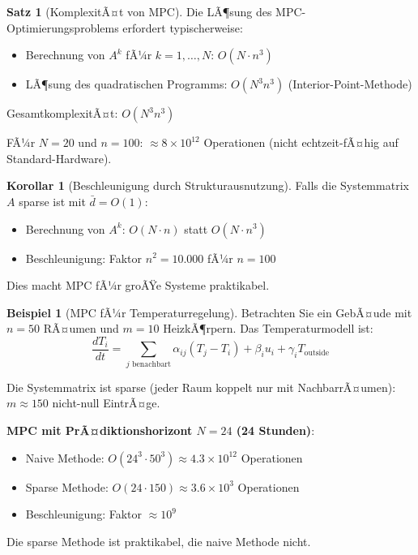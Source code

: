 ﻿\documentclass[a4paper,12pt]{report}
\theoremstyle{definition}
\newtheorem{beispiel}{Beispiel}
\newtheorem{satz}{Satz}
\newtheorem{korollar}{Korollar}
\begin{document}
	\begin{satz}[KomplexitÃ¤t von MPC]
		Die LÃ¶sung des MPC-Optimierungsproblems erfordert typischerweise:
		\begin{itemize}
			\item Berechnung von $A^k$ fÃ¼r $k = 1, \ldots, N$: $O(N \cdot n^3)$
			\item LÃ¶sung des quadratischen Programms: $O(N^3 n^3)$ (Interior-Point-Methode)
		\end{itemize}
		
		GesamtkomplexitÃ¤t: $O(N^3 n^3)$
		
		FÃ¼r $N = 20$ und $n = 100$: $\approx 8 \times 10^{12}$ Operationen (nicht echtzeit-fÃ¤hig auf Standard-Hardware).
	\end{satz}
	
	\begin{korollar}[Beschleunigung durch Strukturausnutzung]
		Falls die Systemmatrix $A$ sparse ist mit $\bar{d} = O(1)$:
		\begin{itemize}
			\item Berechnung von $A^k$: $O(N \cdot n)$ statt $O(N \cdot n^3)$
			\item Beschleunigung: Faktor $n^2 = 10.000$ fÃ¼r $n = 100$
		\end{itemize}
		
		Dies macht MPC fÃ¼r groÃŸe Systeme praktikabel.
	\end{korollar}
	
	\begin{beispiel}[MPC fÃ¼r Temperaturregelung]
		Betrachten Sie ein GebÃ¤ude mit $n = 50$ RÃ¤umen und $m = 10$ HeizkÃ¶rpern. Das Temperaturmodell ist:
		\[
		\frac{dT_i}{dt} = \sum_{j \text{ benachbart}} \alpha_{ij} (T_j - T_i) + \beta_i u_i + \gamma_i T_{\text{outside}}
		\]
		
		Die Systemmatrix ist sparse (jeder Raum koppelt nur mit NachbarrÃ¤umen): $m \approx 150$ nicht-null EintrÃ¤ge.
		
		\textbf{MPC mit PrÃ¤diktionshorizont $N = 24$ (24 Stunden)}:
		\begin{itemize}
			\item Naive Methode: $O(24^3 \cdot 50^3) \approx 4.3 \times 10^{12}$ Operationen
			\item Sparse Methode: $O(24 \cdot 150) \approx 3.6 \times 10^3$ Operationen
			\item Beschleunigung: Faktor $\approx 10^9$
		\end{itemize}
		
		Die sparse Methode ist praktikabel, die naive Methode nicht.
	\end{beispiel}
	
\end{document}
